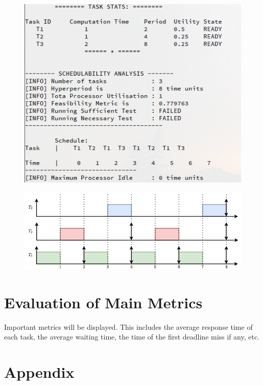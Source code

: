 \begin{figure}[!ht]
\centering
\begin{minipage}{.5\textwidth}
  \centering
  \includegraphics[width=\linewidth]{../imgs/sim-test3}
  \label{fig:case3-output}
\end{minipage}%
\begin{minipage}{.5\textwidth}
  \centering
  \includegraphics[width=\linewidth]{../imgs/sim-result-case-3}
  \label{fig:case3-schedule}
\end{minipage}
\end{figure}
\pagebreak
\section{Evaluation of Main Metrics}\label{sec:main-metrics}
Important metrics will be displayed. This includes the average response time of each task, the average waiting time, the time of the first deadline miss if any, etc.




\pagebreak
\section*{Appendix}


